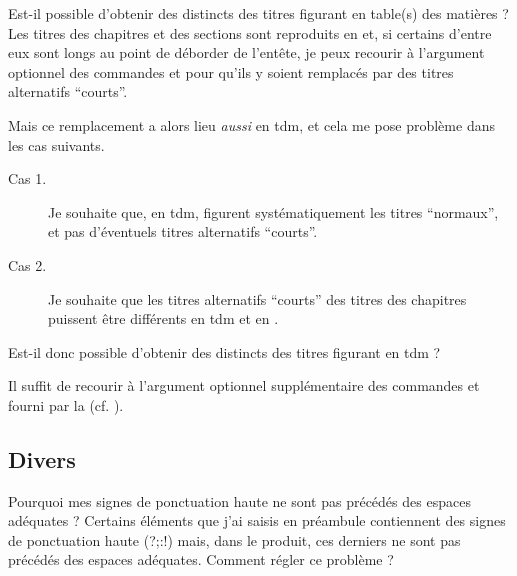 \begin{dbfaq}{Est-il possible d'obtenir des  distincts
    des titres figurant en table(s) des matières ?}{}
  Les titres des chapitres et des sections sont reproduits en
   et, si certains d'entre eux sont longs au point de
  déborder de l'entête, je peux recourir à l'argument optionnel des commandes
   et  pour qu'ils y soient
  remplacés par des titres alternatifs \enquote{courts}.

  Mais ce remplacement a alors lieu \emph{aussi} en \gls{tdm}, et cela me pose
  problème dans les cas suivants.
  \begin{description}
  \item[Cas 1.] Je souhaite que, en \gls{tdm}, figurent systématiquement les
    titres \enquote{normaux}, et pas d'éventuels titres alternatifs
    \enquote{courts}.
  \item[Cas 2.] Je souhaite que les titres alternatifs \enquote{courts} des
    titres des chapitres puissent être différents en \gls{tdm} et en
    .
  \end{description}
  Est-il donc possible d'obtenir des  distincts des
  titres figurant en \gls{tdm} ?%
\end{dbfaq}

Il suffit de recourir à l'argument optionnel supplémentaire des commandes
 et  fourni par la \yatCl{}
(cf. ).

\subsection{Divers}
\label{sec-divers}

\begin{dbfaq}{Pourquoi mes signes de ponctuation haute ne sont pas précédés des
    espaces adéquates ?}{}
  Certains éléments que j'ai saisis en préambule contiennent des signes de
  ponctuation haute ({\NoAutoSpacing?;:!}) mais, dans le \pdf{} produit, ces
  derniers ne sont pas précédés des espaces adéquates. Comment régler ce
  problème ?
\end{dbfaq}

